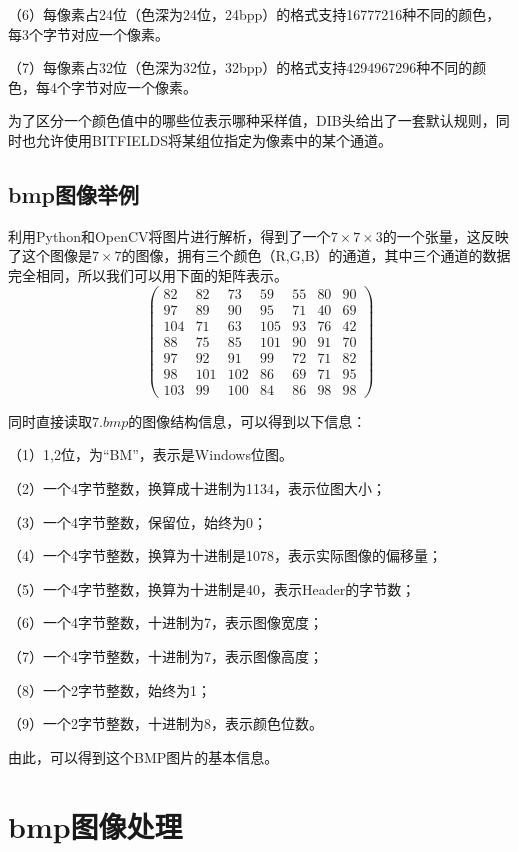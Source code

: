 \documentclass[UTF8]{ctexart}
\begin{document}
（6）每像素占24位（色深为24位，24bpp）的格式支持16777216种不同的颜色，每3个字节对应一个像素。

（7）每像素占32位（色深为32位，32bpp）的格式支持4294967296种不同的颜色，每4个字节对应一个像素。

为了区分一个颜色值中的哪些位表示哪种采样值，DIB头给出了一套默认规则，同时也允许使用BITFIELDS将某组位指定为像素中的某个通道。

\subsection{bmp图像举例}

利用Python和OpenCV将图片进行解析，得到了一个$7\times7\times3$的一个张量，这反映了这个图像是$7\times7$的图像，拥有三个颜色（R,G,B）的通道，其中三个通道的数据完全相同，所以我们可以用下面的矩阵表示。
\[\left( \begin{array}{ccccccc}
82  & 82  & 73  & 59  & 55  & 80  & 90 \\
97  & 89  & 90  & 95  & 71  & 40  & 69 \\
104 & 71  & 63  & 105 & 93  & 76  & 42 \\
88  & 75  & 85  & 101 & 90  & 91  & 70 \\
97  & 92  & 91  & 99  & 72  & 71  & 82 \\
98  & 101 & 102 & 86  & 69  & 71  & 95 \\
103 & 99  & 100 & 84  & 86  & 98  & 98 
\end{array} \right)\]

同时直接读取$7.bmp$的图像结构信息，可以得到以下信息：

（1）1,2位，为``BM''，表示是Windows位图。

（2）一个4字节整数，换算成十进制为1134，表示位图大小； 

（3）一个4字节整数，保留位，始终为0； 

（4）一个4字节整数，换算为十进制是1078，表示实际图像的偏移量； 

（5）一个4字节整数，换算为十进制是40，表示Header的字节数； 

（6）一个4字节整数，十进制为7，表示图像宽度； 

（7）一个4字节整数，十进制为7，表示图像高度； 

（8）一个2字节整数，始终为1； 

（9）一个2字节整数，十进制为8，表示颜色位数。

由此，可以得到这个BMP图片的基本信息。

\section{bmp图像处理}
\end{document}
